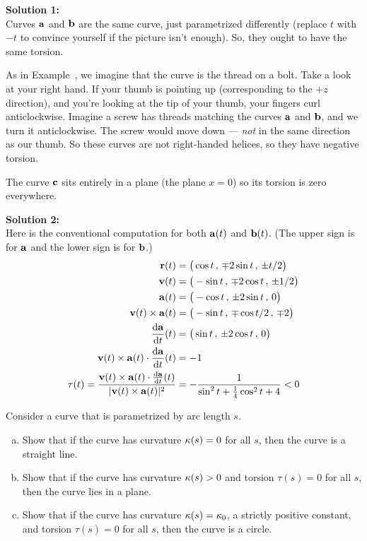 \begin{solution}
\textbf{Solution 1:}\\
	Curves $\mathbf{a}$ and $\mathbf{b}$ are the same curve, just parametrized differently (replace $t$ with $-t$ to convince yourself if the picture isn't enough). So, they ought to have the same torsion.
	
	As in  Example~, we imagine that the curve is the thread on a bolt. Take a look at your right hand. If your thumb is pointing up (corresponding to the $+z$ direction), and you're looking at the tip of your thumb, your fingers curl anticlockwise. Imagine a screw has threads matching the curves $\mathbf{a}$ and $\mathbf{b}$, and we turn it anticlockwise. The screw would move down --- \emph{not} in the same direction as our thumb. So these curves are not right-handed helices, so they have negative torsion.
	
	The curve $\mathbf{c}$ sits entirely in a plane (the plane $x=0$) so its torsion is zero everywhere.
	
\textbf{Solution 2:}\\
Here
is the conventional computation for both $\mathbf{a}(t)$ and $\mathbf{b}(t)$.
(The upper sign is for $\mathbf{a}$ and the lower sign is for $\mathbf{b}$.)
\begin{align*}
\vr(t)&=\big(\cos t\,,\,\mp 2\sin t \,,\,\pm t/2\big) \\
\vv(t)&=\big(-\sin t\,,\,\mp 2\cos t \,,\,\pm 1/2\big) \\
\va(t)&=\big(-\cos t\,,\,\pm 2\sin t \,,\,0\big) \\
\vv(t)\times\va(t)&=\big(-\sin t\,,\,\mp\cos t/2\,,\,\mp 2\big) \\
\diff{\va}{t}(t)&=\big(\sin t\,,\,\pm 2\cos t\,,\,0\big) \\
\vv(t)\times\va(t)\cdot \diff{\va}{t}(t) &= -1 \\
\tau(t)=\frac{\vv(t)\times\va(t)\cdot \diff{\va}{t}(t)}{|\vv(t)\times\va(t)|^2}
  &=-\frac{1}{\sin^2 t+\frac{1}{4}\cos^2 t+4}
   <0
\end{align*}
\end{solution}

\begin{question}
Consider a curve that is parametrized by arc length $s$.
\begin{enumerate}[(a)]
\item
Show that if the curve has curvature $\kappa(s)=0$
for all $s$, then the curve is a straight line.

\item
Show that if the curve has curvature $\kappa(s)>0$ and
torsion $\tau(s)=0$ for all $s$, then the curve lies in a plane.

\item
Show that if the curve has curvature $\kappa(s)=\kappa_0$,
a strictly positive constant, and torsion $\tau(s)=0$
for all $s$, then the curve is a circle.
\end{enumerate}
\end{question}

